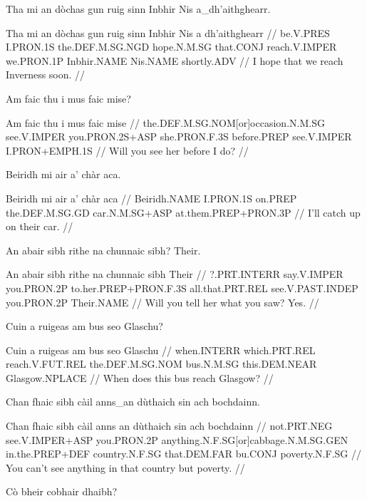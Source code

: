 \documentclass[a4paper,10pt]{article}
\begin{document}
\ex
\begingl
\glpre Tha mi an dòchas gun ruig sinn Inbhir Nis a\_dh'aithghearr. 

\vspace{4mm}
\gla Tha mi an dòchas gun ruig sinn Inbhir Nis {a dh'aithghearr}  //
\glb be.V.PRES I.PRON.1S the.DEF.M.SG.NGD hope.N.M.SG that.CONJ reach.V.IMPER we.PRON.1P Inbhir.NAME Nis.NAME shortly.ADV  //
\glft I hope that we reach Inverness soon. //
\endgl
\xe

\ex
\begingl
\glpre Am faic thu i mus faic mise? 

\vspace{4mm}
\gla Am faic thu i mus faic mise  //
\glb the.DEF.M.SG.NOM[or]occasion.N.M.SG see.V.IMPER you.PRON.2S+ASP she.PRON.F.3S before.PREP see.V.IMPER I.PRON+EMPH.1S  //
\glft Will you see her before I do? //
\endgl
\xe

\ex
\begingl
\glpre Beiridh mi air a' chàr aca. 

\vspace{4mm}
\gla Beiridh mi air a' chàr aca  //
\glb Beiridh.NAME I.PRON.1S on.PREP the.DEF.M.SG.GD car.N.M.SG+ASP at.them.PREP+PRON.3P  //
\glft I'll catch up on their car. //
\endgl
\xe

\ex
\begingl
\glpre An abair sibh rithe na chunnaic sibh? Their. 

\vspace{4mm}
\gla An abair sibh rithe na chunnaic sibh Their  //
\glb ?.PRT.INTERR say.V.IMPER you.PRON.2P to.her.PREP+PRON.F.3S all.that.PRT.REL see.V.PAST.INDEP you.PRON.2P Their.NAME  //
\glft Will you tell her what you saw? Yes. //
\endgl
\xe

\ex
\begingl
\glpre Cuin a ruigeas am bus seo Glaschu? 

\vspace{4mm}
\gla Cuin a ruigeas am bus seo Glaschu  //
\glb when.INTERR which.PRT.REL reach.V.FUT.REL the.DEF.M.SG.NOM bus.N.M.SG this.DEM.NEAR Glasgow.NPLACE  //
\glft When does this bus reach Glasgow? //
\endgl
\xe

\ex
\begingl
\glpre Chan fhaic sibh càil anns\_an dùthaich sin ach bochdainn. 

\vspace{4mm}
\gla Chan fhaic sibh càil {anns an} dùthaich sin ach bochdainn  //
\glb not.PRT.NEG see.V.IMPER+ASP you.PRON.2P anything.N.F.SG[or]cabbage.N.M.SG.GEN in.the.PREP+DEF country.N.F.SG that.DEM.FAR bu.CONJ poverty.N.F.SG  //
\glft You can't see anything in that country but poverty. //
\endgl
\xe

\ex
\begingl
\glpre Cò bheir cobhair dhaibh? 
\end{document}
